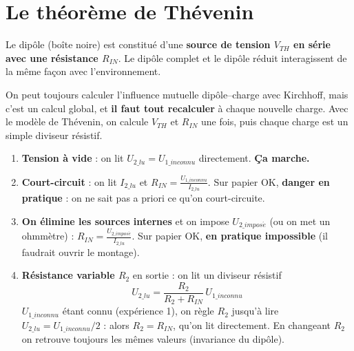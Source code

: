 \section{Le théorème de Thévenin}


\begin{thmbox}[title={Théorème de Thévenin (Léon Charles, 1883)}]
\og Le dipôle (boîte noire) est constitué d'une \textbf{source de tension $V_{TH}$ en série
avec une résistance $R_{IN}$}.\fg{} Le dipôle complet et le dipôle réduit interagissent de la
même façon avec l'environnement.
\end{thmbox}

\begin{rembox}[title=Pourquoi c'est utile]
On peut toujours calculer l'influence mutuelle dipôle--charge avec Kirchhoff, mais c'est un
calcul global, et \textbf{il faut tout recalculer} à chaque nouvelle charge. Avec le modèle
de Thévenin, on calcule $V_{TH}$ et $R_{IN}$ une fois, puis chaque charge est un simple
diviseur résistif.
\end{rembox}


\begin{propbox}[title={Mesurer le modèle de Thévenin : quatre expériences}]
\begin{enumerate}
  \item \textbf{Tension à vide} : on lit $U_{2\_lu} = U_{1\_inconnu}$ directement. \textbf{Ça
        marche.}
  \item \textbf{Court-circuit} : on lit $I_{2\_lu}$ et $R_{IN} = \frac{U_{1\_inconnu}}{I_{2\_lu}}$.
        Sur papier OK, \textbf{danger en pratique} : on ne sait pas a priori ce qu'on
        court-circuite.
  \item \textbf{On élimine les sources internes} et on impose $U_{2\_impos\acute e}$ (ou on
        met un ohmmètre) : $R_{IN} = \frac{U_{2\_impos\acute e}}{I_{2\_lu}}$. Sur papier OK,
        \textbf{en pratique impossible} (il faudrait ouvrir le montage).
  \item \textbf{Résistance variable $R_2$} en sortie : on lit un diviseur résistif
        \[ U_{2\_lu} = \frac{R_2}{R_2 + R_{IN}}\,U_{1\_inconnu} \]
        $U_{1\_inconnu}$ étant connu (expérience 1), on règle $R_2$ jusqu'à lire
        $U_{2\_lu} = U_{1\_inconnu}/2$ : alors \textbf{$R_2 = R_{IN}$}, qu'on lit directement.
        En changeant $R_2$ on retrouve toujours les mêmes valeurs (invariance du dipôle).
\end{enumerate}
\end{propbox}

